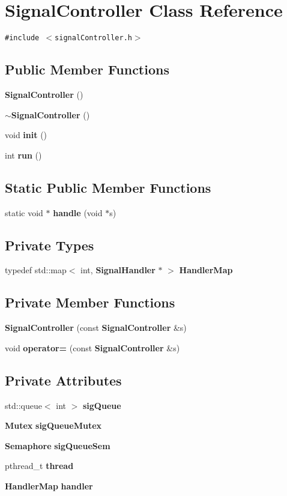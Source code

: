 \section{Signal\-Controller Class Reference}
\label{classSignalController}
{\tt \#include $<$signal\-Controller.h$>$}

\subsection*{Public Member Functions}
\begin{CompactItemize}
\item 
{\bf Signal\-Controller} ()
\item 
{\bf $\sim$Signal\-Controller} ()
\item 
void {\bf init} ()
\item 
int {\bf run} ()
\end{CompactItemize}
\subsection*{Static Public Member Functions}
\begin{CompactItemize}
\item 
static void $\ast$ {\bf handle} (void $\ast$s)
\end{CompactItemize}
\subsection*{Private Types}
\begin{CompactItemize}
\item 
typedef std::map$<$ int, {\bf Signal\-Handler} $\ast$ $>$ {\bf Handler\-Map}
\end{CompactItemize}
\subsection*{Private Member Functions}
\begin{CompactItemize}
\item 
{\bf Signal\-Controller} (const {\bf Signal\-Controller} \&s)
\item 
void {\bf operator=} (const {\bf Signal\-Controller} \&s)
\end{CompactItemize}
\subsection*{Private Attributes}
\begin{CompactItemize}
\item 
std::queue$<$ int $>$ {\bf sig\-Queue}
\item 
{\bf Mutex} {\bf sig\-Queue\-Mutex}
\item 
{\bf Semaphore} {\bf sig\-Queue\-Sem}
\item 
pthread\_\-t {\bf thread}
\item 
{\bf Handler\-Map} {\bf handler}
\end{CompactItemize}


